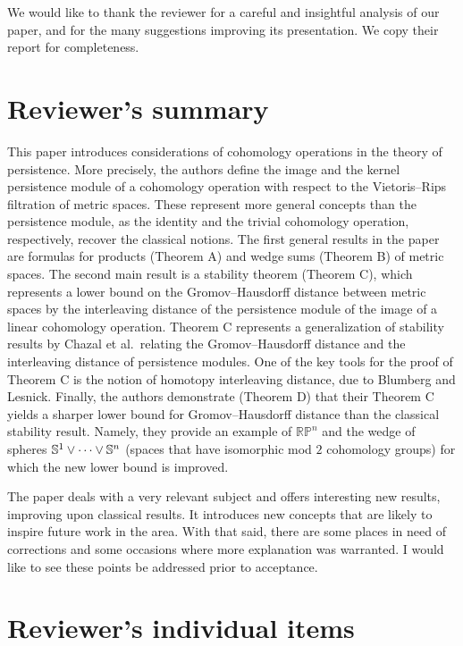 \documentclass{amsart}
\begin{document}
    \setcounter{section}{0}

	We would like to thank the reviewer for a careful and insightful analysis of our paper, and for the many suggestions improving its presentation.
	We copy their report for completeness.

	\section{Reviewer's summary}

	This paper introduces considerations of cohomology operations in the theory of persistence.
	More precisely, the authors define the image and the kernel persistence module of a cohomology operation with respect to the Vietoris--Rips filtration of metric spaces.
	These represent more general concepts than the persistence module, as the identity and the trivial cohomology operation, respectively, recover the classical notions.
	The first general results in the paper are formulas for products (Theorem A) and wedge sums (Theorem B) of metric spaces.
	The second main result is a stability theorem (Theorem C), which represents a lower bound on the Gromov--Hausdorff distance between metric spaces by the interleaving distance of the persistence module of the image of a linear cohomology operation.
	Theorem C represents a generalization of stability results by Chazal et al.\ relating the Gromov--Hausdorff distance and the interleaving distance of persistence modules.
	One of the key tools for the proof of Theorem C is the notion of homotopy interleaving distance, due to Blumberg and Lesnick.
	Finally, the authors demonstrate (Theorem D) that their Theorem C yields a sharper lower bound for Gromov--Hausdorff distance than the classical stability result.
	Namely, they provide an example of $\mathbb{RP}^n$ and the wedge of spheres $\mathbb{S}^1 \vee \cdots \vee \mathbb{S}^n$ (spaces that have isomorphic mod $2$ cohomology groups) for which the new lower bound is improved.

	The paper deals with a very relevant subject and offers interesting new results, improving upon classical results.
	It introduces new concepts that are likely to inspire future work in the area.
	With that said, there are some places in need of corrections and some occasions where more explanation was warranted.
	I would like to see these points be addressed prior to acceptance.

	\section{Reviewer's individual items}
\end{document}
